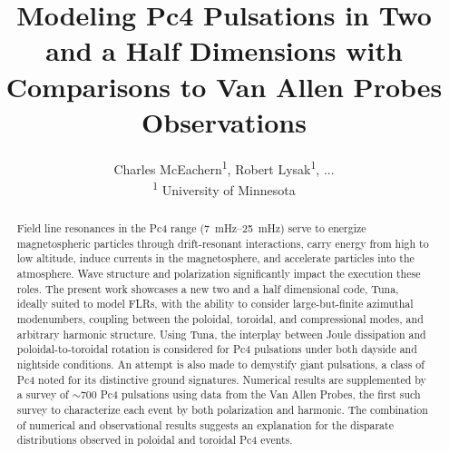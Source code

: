 \documentclass{article}
\newcommand{\about}{\ensuremath{\sim}}
\begin{document}
\title{Modeling Pc4 Pulsations in Two and a Half Dimensions with
       Comparisons to Van Allen Probes Observations}
\author{
    Charles McEachern\textsuperscript{1},
    Robert Lysak\textsuperscript{1},
    ... \\
    \textsuperscript{1} University of Minnesota
}




\maketitle



\begin{abstract}

Field line resonances in the Pc4 range (\SIrange{7}{25}{\mHz}) serve
to energize magnetospheric particles through drift-resonant
interactions, carry energy from high to low altitude, induce currents in
the magnetosphere, and accelerate particles into the atmosphere. Wave
structure and polarization significantly impact the execution these
roles. The present work showcases a new two and a half dimensional code,
Tuna, ideally suited to model FLRs, with the ability to consider
large-but-finite azimuthal modenumbers, coupling between the poloidal,
toroidal, and compressional modes, and arbitrary harmonic structure.
Using Tuna, the interplay between Joule dissipation and
poloidal-to-toroidal rotation is considered for Pc4 pulsations under
both dayside and nightside conditions. An attempt is also made to
demystify giant pulsations, a class of Pc4 noted for its distinctive
ground signatures. Numerical results are supplemented by a survey of
\about700 Pc4 pulsations using data from the Van Allen Probes, the first
such survey to characterize each event by both polarization and
harmonic. The combination of numerical and observational results
suggests an explanation for the disparate distributions observed in
poloidal and toroidal Pc4 events. 

\end{abstract}

\end{document}
